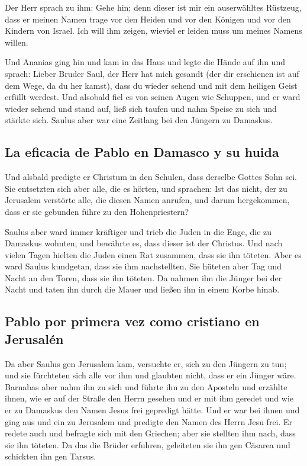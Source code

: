  Der Herr sprach zu ihm: Gehe hin; denn dieser ist mir
ein auserwähltes Rüstzeug, dass er meinen Namen trage vor den Heiden und
vor den Königen und vor den Kindern von Israel.  Ich will
ihm zeigen, wieviel er leiden muss um meines Namens willen.

 Und Ananias ging hin und kam in das Haus und legte die
Hände auf ihn und sprach: Lieber Bruder Saul, der Herr hat mich gesandt
(der dir erschienen ist auf dem Wege, da du her kamst), dass du wieder
sehend und mit dem heiligen Geist erfüllt werdest.  Und
alsobald fiel es von seinen Augen wie Schuppen, und er ward wieder
sehend  und stand auf, ließ sich taufen und nahm Speise
zu sich und stärkte sich. Saulus aber war eine Zeitlang bei den Jüngern
zu Damaskus.

\hypertarget{la-eficacia-de-pablo-en-damasco-y-su-huida}{%
\subsection{La eficacia de Pablo en Damasco y su
huida}\label{la-eficacia-de-pablo-en-damasco-y-su-huida}}

 Und alsbald predigte er Christum in den Schulen, dass
derselbe Gottes Sohn sei.  Sie entsetzten sich aber alle,
die es hörten, und sprachen: Ist das nicht, der zu Jerusalem verstörte
alle, die diesen Namen anrufen, und darum hergekommen, dass er sie
gebunden führe zu den Hohenpriestern?

 Saulus aber ward immer kräftiger und trieb die Juden in
die Enge, die zu Damaskus wohnten, und bewährte es, dass dieser ist der
Christus.  Und nach vielen Tagen hielten die Juden einen
Rat zusammen, dass sie ihn töteten.  Aber es ward Saulus
kundgetan, dass sie ihm nachstellten. Sie hüteten aber Tag und Nacht an
den Toren, dass sie ihn töteten.  Da nahmen ihn die
Jünger bei der Nacht und taten ihn durch die Mauer und ließen ihn in
einem Korbe hinab.

\hypertarget{pablo-por-primera-vez-como-cristiano-en-jerusaluxe9n}{%
\subsection{Pablo por primera vez como cristiano en
Jerusalén}\label{pablo-por-primera-vez-como-cristiano-en-jerusaluxe9n}}

 Da aber Saulus gen Jerusalem kam, versuchte er, sich zu
den Jüngern zu tun; und sie fürchteten sich alle vor ihm und glaubten
nicht, dass er ein Jünger wäre.  Barnabas aber nahm ihn
zu sich und führte ihn zu den Aposteln und erzählte ihnen, wie er auf
der Straße den Herrn gesehen und er mit ihm geredet und wie er zu
Damaskus den Namen Jesus frei gepredigt hätte.  Und er
war bei ihnen und ging aus und ein zu Jerusalem und predigte den Namen
des Herrn Jesu frei.  Er redete auch und befragte sich
mit den Griechen; aber sie stellten ihm nach, dass sie ihn töteten.
 Da das die Brüder erfuhren, geleiteten sie ihn gen
Cäsarea und schickten ihn gen Tarsus.

